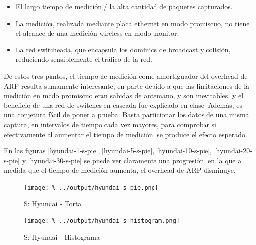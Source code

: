\documentclass[final,inline,a4paper,narroweqnarray]{ieee}
\begin{document}
    \begin{itemize}

    \item El largo tiempo de medición / la alta cantidad de paquetes
    capturados.

    \item La medición, realizada mediante placa ethernet en modo
    promiscuo, no tiene el alcance de una medición wireless en modo
    monitor.

    \item La red switcheada, que encapsula los dominios de broadcast y
    colisión, reduciendo sensiblemente el tráfico de la red.

    \end{itemize}

    De estos tres puntos, el tiempo de medición como amortiguador del
    overhead de ARP resulta sumamente interesante, en parte debido a
    que las limitaciones de la medición en modo promiscuo eran sabidas
    de antemano, y son inevitables, y el beneficio de una red de
    switches en cascada fue explicado en clase. Además, es una
    conjetura fácil de poner a prueba. Basta particionar los datos de
    una misma captura, en intervalos de tiempo cada vez mayores, para
    comprobar si efectivamente al aumentar el tiempo de medición, se
    produce el efecto esperado. 

    En las figuras \ref{hyundai-1-s-pie}, \ref{hyundai-5-s-pie},
    \ref{hyundai-10-s-pie}, \ref{hyundai-20-s-pie} y
    \ref{hyundai-30-s-pie} se puede ver claramente una progresión, en
    la que a medida que el tiempo de medición aumenta, el overhead de
    ARP disminuye.

    \begin{figure}[h]\begin{center}
      \texttt{[image: \%
      ../output/hyundai-s-pie.png]}
      \vspace{-3em}
      \caption{S: Hyundai - Torta}
      \label{hyundai-s-pie}
    \end{center}\end{figure}

    \begin{figure}[h]\begin{center}
      \texttt{[image: \%
      ../output/hyundai-s-histogram.png]}
      \caption{S: Hyundai - Histograma}
      \label{hyundai-s-histogram}
    \end{center}\end{figure}
\end{document}
